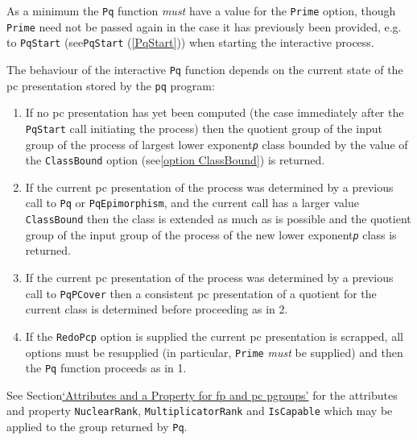 \documentclass[a4paper,11pt]{report}
\begin{document}
{{{ As a minimum the \texttt{Pq} function \emph{must} have a value for the \texttt{Prime} option, though \texttt{Prime} need not be passed again in the case it has previously been provided, e.g. to \texttt{PqStart} (see{\nobreakspace}\texttt{PqStart} (\ref{PqStart})) when starting the interactive process. 

 The behaviour of the interactive \texttt{Pq} function depends on the current state of the pc presentation stored by the \texttt{pq} program: 
\begin{enumerate}
\item  If no pc presentation has yet been computed (the case immediately after the \texttt{PqStart} call initiating the process) then the quotient group of the input group of the
process of largest lower exponent\texttt{}\mbox{\texttt{\mdseries\slshape p}} class bounded by the value of the \texttt{ClassBound} option (see{\nobreakspace}\ref{option ClassBound}) is returned. 
\item  If the current pc presentation of the process was determined by a previous
call to \texttt{Pq} or \texttt{PqEpimorphism}, and the current call has a larger value \texttt{ClassBound} then the class is extended as much as is possible and the quotient group of
the input group of the process of the new lower exponent\texttt{}\mbox{\texttt{\mdseries\slshape p}} class is returned. 
\item  If the current pc presentation of the process was determined by a previous
call to \texttt{PqPCover} then a consistent pc presentation of a quotient for the current class is
determined before proceeding as in 2. 
\item  If the \texttt{RedoPcp} option is supplied the current pc presentation is scrapped, all options must
be re\texttt{}supplied (in particular, \texttt{Prime} \emph{must} be supplied) and then the \texttt{Pq} function proceeds as in 1. 
\end{enumerate}
 See Section{\nobreakspace}\hyperref[Attributes and a Property for fp and pc p-groups]{`Attributes and a Property for fp and pc p\texttt{}groups'} for the attributes and property \texttt{NuclearRank}, \texttt{MultiplicatorRank} and \texttt{IsCapable} which may be applied to the group returned by \texttt{Pq}. 

}}}
\end{document}
